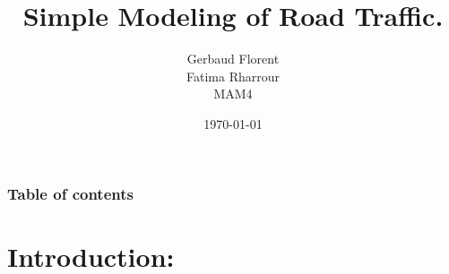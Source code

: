 \documentclass{beamer}
\title[2023-2024]{Simple Modeling of Road Traffic.}
\author{Gerbaud Florent \\ Fatima Rharrour \\ MAM4}
\institute[Polytech Nice-Sophia] %
{
Supervisor: \\ %
\medskip
{Didier Auroux} %
}
\date{\today} %
\begin{document}
\begin{frame}
\titlepage 
\end{frame}

\begin{frame}
\frametitle{Table of contents} 
\tableofcontents
\end{frame}


\section{Introduction:} 
\end{document}
